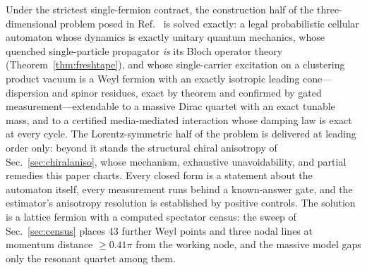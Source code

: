 \documentclass[aps,prd,twocolumn,superscriptaddress,nofootinbib,floatfix]{revtex4-2}
\begin{document}
Under the strictest single-fermion contract, the construction half of
the three-dimensional problem posed in Ref.~\cite{Wetterich2022} is
solved exactly: a legal probabilistic cellular automaton whose dynamics
is exactly unitary quantum mechanics, whose quenched single-particle
propagator \emph{is} its Bloch operator theory
(Theorem~\ref{thm:freshtape}), and whose single-carrier excitation on a
clustering product vacuum is a Weyl fermion with an exactly isotropic
leading cone---dispersion and spinor residues, exact by theorem and
confirmed by gated measurement---extendable to a massive Dirac quartet
with an exact tunable mass, and to a certified media-mediated
interaction whose damping law is exact at every cycle. The
Lorentz-symmetric half of the problem is delivered at leading order
only: beyond it stands the structural chiral anisotropy of
Sec.~\ref{sec:chiralaniso}, whose mechanism, exhaustive
unavoidability, and partial remedies this paper charts. Every closed form is a statement
about the automaton itself, every measurement runs behind a
known-answer gate, and the estimator's anisotropy resolution is
established by positive controls. The solution is a lattice fermion
with a computed spectator census: the sweep of Sec.~\ref{sec:census}
places 43 further Weyl points and three nodal lines at momentum
distance $\ge0.41\pi$ from the working node, and the massive model gaps
only the resonant quartet among them.
\end{document}
